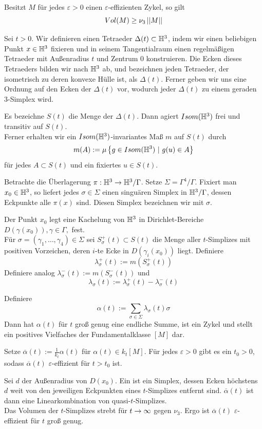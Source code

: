\documentclass{book}
\renewcommand{\epsilon}{\varepsilon}
\begin{document}
\Lem{}
Besitzt $M$ für jedes $\epsilon > 0$ einen $\epsilon$-effizienten Zykel, so gilt
\[ Vol({M}) \geq \nu_3 \left|\left|M\right|\right| \]

\Def{}
Sei $t > 0$. Wir definieren einen Tetraeder $\Delta(t) \subset \mathbb{H}^3$, indem wir einen beliebigen Punkt $x \in \mathbb{H}^3$ fixieren und in seinem Tangentialraum einen regelmäßigen Tetraeder mit Außenradius $t$ und Zentrum $0$ konstruieren. Die Ecken dieses Tetraeders bilden wir nach $\mathbb{H}^3$ ab, und bezeichnen jeden Tetraeder, der isometrisch zu deren konvexe Hülle ist, als $\Delta(t)$. Ferner geben wir uns eine Ordnung auf den Ecken der $\Delta(t)$ vor, wodurch jeder $\Delta(t)$ zu einem geraden 3-Simplex wird.

\Bem{}
Es bezeichne $S(t)$ die Menge der $\Delta(t)$. Dann agiert $Isom(\mathbb{H}^3)$ frei und transitiv auf $S(t)$.\\
Ferner erhalten wir ein $Isom(\mathbb{H}^3)$-invariantes Maß $m$ auf $S(t)$ durch
\[ m(A) := \mu \set{ g \in Isom(\H^3) }{ g(u) \in A } \]
für jedes $A \subset S(t)$ und ein fixiertes $u \in S(t)$.

\Def{}
Betrachte die Überlagerung $\pi : \mathbb{H}^3 \overset{}{\rightarrow} \mathbb{H}^3 / \Gamma$. Setze $\Sigma = \Gamma^4 / \Gamma$. Fixiert man $x_0 \in \mathbb{H}^3$, so liefert jedes $\sigma \in \Sigma$ einen singuären Simplex in $\mathbb{H}^3 / \Gamma$, dessen Eckpunkte alle $\pi(x)$ sind. Diesen Simplex bezeichnen wir mit $\sigma$.

\Def{}
Der Punkt $x_0$ legt eine Kachelung von $\mathbb{H}^3$ in Dirichlet-Bereiche $D(\gamma(x_0)), \gamma \in \Gamma,$ fest.\\
Für $\sigma = (\gamma_1,\ldots, \gamma_4)\in \Sigma$ sei $S^+_\sigma(t) \subset S(t)$ die Menge aller $t$-Simplizes mit positiven Vorzeichen, deren $i$-te Ecke in $D(\gamma_i(x_0))$ liegt. Definiere
\[ \lambda^+_\sigma(t) := m(S^+_\sigma(t)) \]
Definiere analog $\lambda^-_\sigma(t) :=  m(S^-_\sigma(t)) $ und
\[ \lambda_\sigma(t) := \lambda_\sigma^+(t) - \lambda_\sigma^-(t) \]

\Lem{}
Definiere
\[ \alpha(t) := \sum_{\sigma \in \Sigma} \lambda_\sigma(t) \sigma \]
Dann hat $\alpha(t)$ für $t$ groß genug eine endliche Summe, ist ein Zykel und stellt ein positives Vielfaches der Fundamentalklasse $[M]$ dar.

\Lem{}
Setze $\overline{\alpha}(t) := \frac{1}{k_t} \alpha(t)$ für $\alpha(t) \in k_t [M]$. Für jedes $\epsilon> 0$ gibt es ein $t_0 > 0$, sodass $\overline{\alpha}(t)$ $\epsilon$-effizient für $t> t_0$ ist.
\begin{Beweis}{}
	Sei $d$ der Außenradius von $D(x_0)$. Ein  ist ein Simplex, dessen Ecken höchstens $d$ weit von den jeweiligen Eckpunkten eines $t$-Simplizes entfernt sind. $\overline{\alpha}(t)$ ist dann eine Linearkombination von quasi-$t$-Simplizes.\\
	Das Volumen der $t$-Simplizes strebt für $t \overset{}{\rightarrow} \infty$ gegen $\nu_3$. Ergo ist $\overline{\alpha}(t)$ $\epsilon$-effizient für $t$ groß genug.
\end{Beweis}
\end{document}
